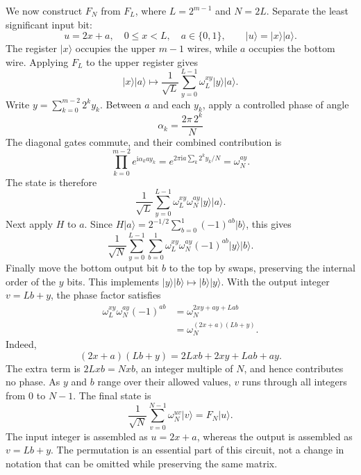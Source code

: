 \documentclass[11pt,oneside,openany]{book}
\providecommand{\ket}{}
\renewcommand{\ket}[1]{\lvert #1\rangle}
\newcommand{\ii}{\mathrm{i}}
\theoremstyle{definition}
\begin{document}
We now construct $F_N$ from $F_L$, where $L=2^{m-1}$ and $N=2L$. Separate the least significant input bit:
\begin{equation}
 u=2x+a,\quad 0\le x<L,\quad a\in\{0,1\},\qquad
 \ket u=\ket x\ket a.
 \label{eq:phase:recursiveinput}
\end{equation}
The register $\ket x$ occupies the upper $m-1$ wires, while $a$ occupies the bottom wire. Applying $F_L$ to the upper register gives
\begin{equation}
 \ket x\ket a\longmapsto
 \frac1{\sqrt L}\sum_{y=0}^{L-1}\omega_L^{xy}\ket y\ket a.
 \label{eq:phase:recursive1}
\end{equation}
Write $y=\sum_{k=0}^{m-2}2^ky_k$. Between $a$ and each $y_k$, apply a controlled phase of angle
\begin{equation}
 \alpha_k=\frac{2\pi\,2^k}{N}
\end{equation}
The diagonal gates commute, and their combined contribution is
\begin{equation}
 \prod_{k=0}^{m-2}e^{\ii\alpha_k a y_k}
 =e^{2\pi\ii a\sum_k2^ky_k/N}=\omega_N^{ay}.
\end{equation}
The state is therefore
\begin{equation}
 \frac1{\sqrt L}\sum_{y=0}^{L-1}\omega_L^{xy}\omega_N^{ay}\ket y\ket a.
 \label{eq:phase:recursive2}
\end{equation}
Next apply $H$ to $a$. Since $H\ket a=2^{-1/2}\sum_{b=0}^1(-1)^{ab}\ket b$, this gives
\begin{equation}
 \frac1{\sqrt N}\sum_{y=0}^{L-1}\sum_{b=0}^1
 \omega_L^{xy}\omega_N^{ay}(-1)^{ab}\ket y\ket b.
 \label{eq:phase:recursive3}
\end{equation}
Finally move the bottom output bit $b$ to the top by swaps, preserving the internal order of the $y$ bits. This implements $\ket y\ket b\mapsto\ket b\ket y$. With the output integer $v=Lb+y$, the phase factor satisfies
\begin{align}
 \omega_L^{xy}\omega_N^{ay}(-1)^{ab}
 &=\omega_N^{2xy+ay+Lab}\\
 &=\omega_N^{(2x+a)(Lb+y)}.
 \label{eq:phase:recursiveidentity}
\end{align}
Indeed,
\begin{equation}
 (2x+a)(Lb+y)=2Lxb+2xy+Lab+ay.
\end{equation}
The extra term is $2Lxb=Nxb$, an integer multiple of $N$, and hence contributes no phase. As $y$ and $b$ range over their allowed values, $v$ runs through all integers from $0$ to $N-1$. The final state is
\begin{equation}
 \frac1{\sqrt N}\sum_{v=0}^{N-1}\omega_N^{uv}\ket v=F_N\ket u.
 \label{eq:phase:recursivefinal}
\end{equation}
The input integer is assembled as $u=2x+a$, whereas the output is assembled as $v=Lb+y$. The permutation is an essential part of this circuit, not a change in notation that can be omitted while preserving the same matrix.
\end{document}

